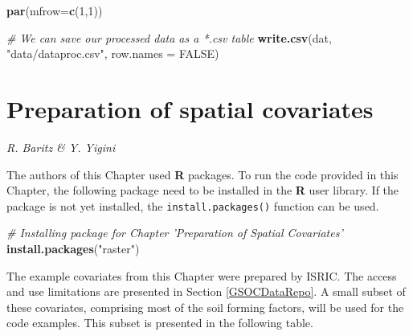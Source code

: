 \documentclass[10pt,b5paper,]{book}
\newenvironment{Shaded}{\begin{snugshade}}{\end{snugshade}}
\newcommand{\CommentTok}[1]{\textcolor[rgb]{0.56,0.35,0.01}{\textit{#1}}}
\newcommand{\DataTypeTok}[1]{\textcolor[rgb]{0.13,0.29,0.53}{#1}}
\newcommand{\DecValTok}[1]{\textcolor[rgb]{0.00,0.00,0.81}{#1}}
\newcommand{\KeywordTok}[1]{\textcolor[rgb]{0.13,0.29,0.53}{\textbf{#1}}}
\newcommand{\NormalTok}[1]{#1}
\newcommand{\OtherTok}[1]{\textcolor[rgb]{0.56,0.35,0.01}{#1}}
\newcommand{\StringTok}[1]{\textcolor[rgb]{0.31,0.60,0.02}{#1}}
\theoremstyle{definition}
\theoremstyle{definition}
\theoremstyle{definition}
\theoremstyle{remark}
\begin{document}
\begin{Shaded}
\begin{Highlighting}[]
\KeywordTok{par}\NormalTok{(}\DataTypeTok{mfrow=}\KeywordTok{c}\NormalTok{(}\DecValTok{1}\NormalTok{,}\DecValTok{1}\NormalTok{))}

\CommentTok{# We can save our processed data as a *.csv table}
\KeywordTok{write.csv}\NormalTok{(dat, }\StringTok{"data/dataproc.csv"}\NormalTok{, }\DataTypeTok{row.names =} \OtherTok{FALSE}\NormalTok{)}
\end{Highlighting}
\end{Shaded}

\hypertarget{covariates}{%
\chapter{Preparation of spatial covariates}\label{covariates}}

\emph{R. Baritz \& Y. Yigini}

The authors of this Chapter used \textbf{R} packages. To run the code
provided in this Chapter, the following package need to be installed in
the \textbf{R} user library. If the package is not yet installed, the
\texttt{install.packages()} function can be used.

\begin{Shaded}
\begin{Highlighting}[]
\CommentTok{# Installing package for Chapter 'Preparation of Spatial Covariates'}
\KeywordTok{install.packages}\NormalTok{(}\StringTok{"raster"}\NormalTok{)}
\end{Highlighting}
\end{Shaded}

The example covariates from this Chapter were prepared by ISRIC. The
access and use limitations are presented in Section \ref{GSOCDataRepo}.
A small subset of these covariates, comprising most of the soil forming
factors, will be used for the code examples. This subset is presented in
the following table.
\end{document}
